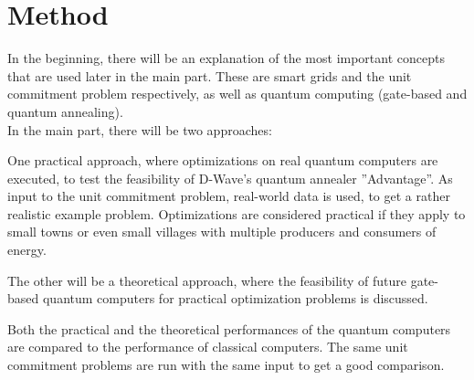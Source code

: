 \section{Method}

In the beginning, there will be an explanation of the most important concepts
that are used later in the main part.
These are smart grids and the unit commitment problem respectively,
as well as quantum computing (gate-based and quantum annealing).\\

\noindent In the main part, there will be two approaches:

One practical approach, where optimizations on real quantum computers are executed,
to test the feasibility of D-Wave's quantum annealer ''Advantage''.
As input to the unit commitment problem, real-world data is used, to get a rather realistic example problem.
Optimizations are considered practical if they apply to small towns or even small villages
with multiple producers and consumers of energy.

The other will be a theoretical approach, where the feasibility of future gate-based quantum computers
for practical optimization problems is discussed.

Both the practical and the theoretical performances of the quantum computers
are compared to the performance of classical computers.
The same unit commitment problems are run with the same input to get a good comparison.
